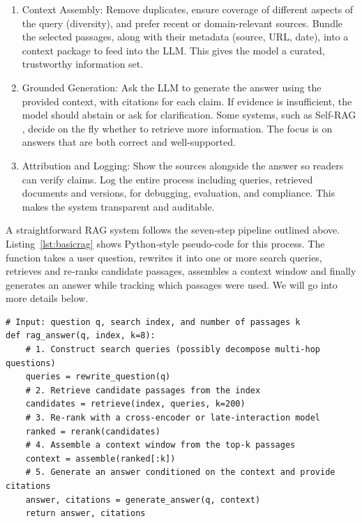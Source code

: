\begin{enumerate}
\item Context Assembly: Remove duplicates, ensure coverage of different aspects of the query (diversity), and prefer recent or domain-relevant sources. Bundle the selected passages, along with their metadata (source, URL, date), into a context package to feed into the LLM. This gives the model a curated, trustworthy information set.

\item Grounded Generation: Ask the LLM to generate the answer using the provided context, with citations for each claim. If evidence is insufficient, the model should abstain or ask for clarification. Some systems, such as Self-RAG \citep{asai2023selfrag}, decide on the fly whether to retrieve more information. The focus is on answers that are both correct and well-supported.

\item Attribution and Logging: Show the sources alongside the answer so readers can verify claims. Log the entire process including queries, retrieved documents and versions, for debugging, evaluation, and compliance. This makes the system transparent and auditable.
\end{enumerate}
%
A straightforward RAG system follows the seven‑step pipeline outlined above.  Listing~\ref{lst:basicrag} shows Python‑style pseudo-code for this process.  The function takes a user question, rewrites it into one or more search queries, retrieves and re‑ranks candidate passages, assembles a context window and finally generates an answer while tracking which passages were used. We will go into more details  below.

\begin{listing}[!ht]
\begin{verbatim}
# Input: question q, search index, and number of passages k
def rag_answer(q, index, k=8):
    # 1. Construct search queries (possibly decompose multi-hop questions)
    queries = rewrite_question(q)
    # 2. Retrieve candidate passages from the index
    candidates = retrieve(index, queries, k=200)
    # 3. Re-rank with a cross-encoder or late-interaction model
    ranked = rerank(candidates)
    # 4. Assemble a context window from the top-k passages
    context = assemble(ranked[:k])
    # 5. Generate an answer conditioned on the context and provide citations
    answer, citations = generate_answer(q, context)
    return answer, citations
\end{verbatim}
\caption{High Level Flow of a Basic RAG Setup}
\label{lst:basicrag}
\end{listing}

